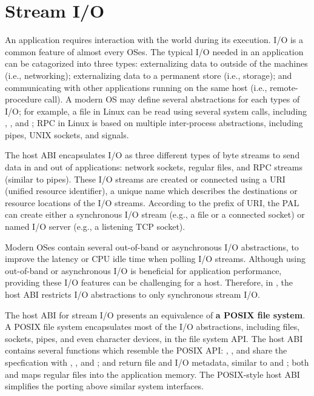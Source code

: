 \section{Stream I/O}
\label{sec:abi:streams}


An application requires interaction with the world during its execution.
I/O is a common feature of almost every OSes.
The typical I/O needed in an application
can be catagorized into three types:
externalizing data to outside of the machines (i.e., networking);
externalizing data to a permanent store (i.e., storage);
and communicating with other applications running on the same host (i.e., remote-procedure call).
A modern OS may define several abstractions
for each types of I/O; for example, a file in Linux can be read using several system calls,
including , , and ;
RPC in Linux is based on multiple inter-process abstractions,
including pipes, UNIX sockets, and signals.




The host ABI
encapsulates I/O as three different types of byte streams
to send data in and out of applications:
network sockets, regular files, and RPC streams (similar to pipes).
These I/O streams
are created or connected using a URI (unified resource identifier),
a unique name which describes the destinations or resource locations of the I/O streams.
According to the prefix of URI,
the PAL can create either a synchronous I/O stream (e.g., a file or a connected socket)
or named I/O server (e.g., a listening TCP socket).


Modern OSes contain several out-of-band or asynchronous I/O abstractions, to improve the latency or CPU idle time
when polling I/O streams.
Although using out-of-band or asynchronous I/O is beneficial for application performance,
providing these I/O features can be challenging for a host.
Therefore, in \graphene{}, the host ABI restricts I/O abstractions to only synchronous stream I/O.



The host ABI for stream I/O presents an equivalence of {\bf a POSIX file system}.
A POSIX file system
encapsulates most of the I/O abstractions,
including files, sockets, pipes, and even character devices,
in the file system API.
The host ABI contains several functions
which resemble the POSIX API:
, , and 
share the specfication with , , and ;
 and  return file and I/O metadata, similar to  and ;
both  and  maps regular files into the application memory. %
The POSIX-style host ABI
simplifies the porting above
similar system interfaces.






